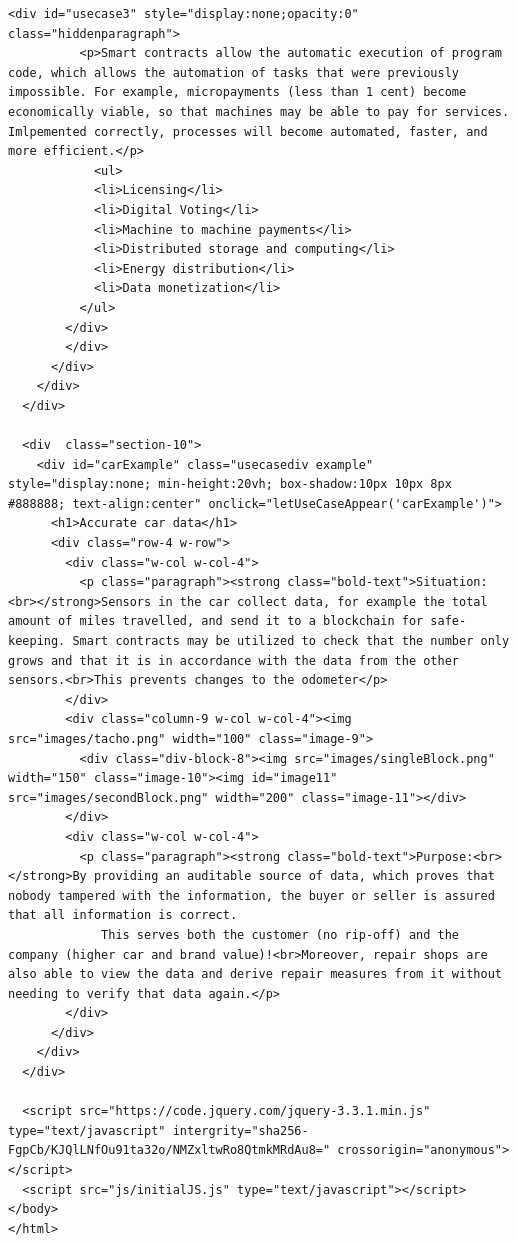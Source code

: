 \begin{lstlisting}
<div id="usecase3" style="display:none;opacity:0"  class="hiddenparagraph">
          <p>Smart contracts allow the automatic execution of program code, which allows the automation of tasks that were previously impossible. For example, micropayments (less than 1 cent) become economically viable, so that machines may be able to pay for services. Imlpemented correctly, processes will become automated, faster, and more efficient.</p>
            <ul>
            <li>Licensing</li>
            <li>Digital Voting</li>
            <li>Machine to machine payments</li>
            <li>Distributed storage and computing</li>
            <li>Energy distribution</li>
            <li>Data monetization</li>
          </ul>
        </div>
        </div>
      </div>
    </div>
  </div>

  <div  class="section-10">
    <div id="carExample" class="usecasediv example" style="display:none; min-height:20vh; box-shadow:10px 10px 8px #888888; text-align:center" onclick="letUseCaseAppear('carExample')">
      <h1>Accurate car data</h1>
      <div class="row-4 w-row">
        <div class="w-col w-col-4">
          <p class="paragraph"><strong class="bold-text">Situation:<br></strong>Sensors in the car collect data, for example the total amount of miles travelled, and send it to a blockchain for safe-keeping. Smart contracts may be utilized to check that the number only grows and that it is in accordance with the data from the other sensors.<br>This prevents changes to the odometer</p>
        </div>
        <div class="column-9 w-col w-col-4"><img src="images/tacho.png" width="100" class="image-9">
          <div class="div-block-8"><img src="images/singleBlock.png" width="150" class="image-10"><img id="image11" src="images/secondBlock.png" width="200" class="image-11"></div>
        </div>
        <div class="w-col w-col-4">
          <p class="paragraph"><strong class="bold-text">Purpose:<br></strong>By providing an auditable source of data, which proves that nobody tampered with the information, the buyer or seller is assured that all information is correct.
             This serves both the customer (no rip-off) and the company (higher car and brand value)!<br>Moreover, repair shops are also able to view the data and derive repair measures from it without needing to verify that data again.</p>
        </div>
      </div>
    </div>
  </div>

  <script src="https://code.jquery.com/jquery-3.3.1.min.js" type="text/javascript" intergrity="sha256-FgpCb/KJQlLNfOu91ta32o/NMZxltwRo8QtmkMRdAu8=" crossorigin="anonymous"></script>
  <script src="js/initialJS.js" type="text/javascript"></script>
</body>
</html>
\end{lstlisting}

